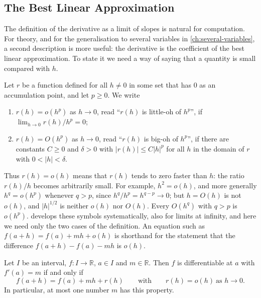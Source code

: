 \subsection{The Best Linear Approximation}

The definition of the derivative as a limit of slopes is natural for computation. For theory, and for the generalisation to several variables in \cref{ch:several-variables}, a second description is more useful: the derivative is the coefficient of the best linear approximation. To state it we need a way of saying that a quantity is small compared with $h$.

\begin{definition}
\label{def:landau}
Let $r$ be a function defined for all $h\ne0$ in some set that has $0$ as an accumulation point, and let $p\ge0$. We write
\begin{enumerate}
\item $r(h)=o(h^p)$ as $h\to0$, read ``$r(h)$ is little-oh of $h^p$'', if $\lim_{h\to0}r(h)/h^p=0$;
\item $r(h)=O(h^p)$ as $h\to0$, read ``$r(h)$ is big-oh of $h^p$'', if there are constants $C\ge0$ and $\delta>0$ with $|r(h)|\le C|h|^p$ for all $h$ in the domain of $r$ with $0<|h|<\delta$.
\end{enumerate}
\end{definition}

Thus $r(h)=o(h)$ means that $r(h)$ tends to zero faster than $h$: the ratio $r(h)/h$ becomes arbitrarily small. For example, $h^2=o(h)$, and more generally $h^q=o(h^p)$ whenever $q>p$, since $h^q/h^p=h^{q-p}\to0$; but $h=O(h)$ is not $o(h)$, and $|h|^{1/2}$ is neither $o(h)$ nor $O(h)$. Every $O(h^q)$ with $q>p$ is $o(h^p)$.  develops these symbols systematically, also for limits at infinity, and here we need only the two cases of the definition. An equation such as $f(a+h)=f(a)+mh+o(h)$ is shorthand for the statement that the difference $f(a+h)-f(a)-mh$ is $o(h)$.

\begin{theorem}
\label{thm:linear-approx}
Let $I$ be an interval, $f\colon I\to\mathbb R$, $a\in I$ and $m\in\mathbb R$. Then $f$ is differentiable at $a$ with $f'(a)=m$ if and only if
\begin{equation}
f(a+h)=f(a)+mh+r(h)\qquad\text{with}\qquad r(h)=o(h)\ \text{as }h\to0 .
\label{eq:linear-approx}
\end{equation}
In particular, at most one number $m$ has this property.
\end{theorem}

